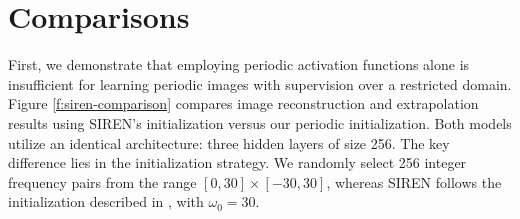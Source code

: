




\section{Comparisons}


First, we demonstrate that employing periodic activation functions alone is insufficient for learning periodic images with supervision over a restricted domain. Figure \ref{f:siren-comparison} compares image reconstruction and extrapolation results using SIREN’s initialization versus our periodic initialization. Both models utilize an identical architecture: three hidden layers of size 256. The key difference lies in the initialization strategy. We randomly select 256 integer frequency pairs from the range $[0, 30] \times [-30, 30]$, whereas SIREN follows the initialization described in \cite{sitzmann2019siren}, with $\omega_0 = 30$. 


